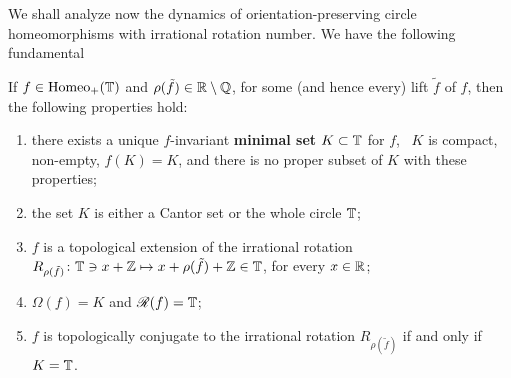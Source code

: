 We shall analyze now the dynamics of orientation-preserving circle homeomorphisms with irrational rotation number. We have the following fundamental

\begin{theorem}
  \label{thm:irrational-rotation-number-minimality}
  If $f\in\mathrm{Homeo}_{+}(\mathbb{T})$ and $\rho(\tilde f)\in\mathbb{R}\setminus\mathbb{Q}$, for some (and hence every) lift $\tilde f$ of $f$, then the following properties hold:
  \begin{enumerate}
    \item there exists a unique $f$-invariant \textbf{minimal set} $K\subset\mathbb{T}$ for $f$, \ie~$K$ is compact, non-empty, $f(K)=K$, and there is no proper subset of $K$ with these properties;
    \item the set $K$ is either a Cantor set or the whole circle $\mathbb{T}$;
    \item $f$ is a topological extension of the irrational rotation $R_{\rho(\tilde f)}\colon\mathbb{T}\ni x+\mathbb{Z}\mapsto x+\rho(\tilde f)+\mathbb{Z}\in\mathbb{T}$, for every $x\in\mathbb{R}$;
    \item $\Omega(f)=K$ and $\mathscr{R{}}(f)=\mathbb{T}$;
    \item $f$ is topologically conjugate to the irrational rotation $R_{\rho(\tilde f)}$ if and only if $K=\mathbb{T}$.
  \end{enumerate}
\end{theorem}


